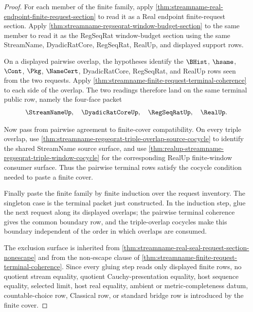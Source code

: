 \begin{proof}
For each member of the finite family, apply
\autoref{thm:streamname-real-endpoint-finite-request-section} to read it as a
Real endpoint finite-request section. Apply
\autoref{thm:streamname-regseqrat-window-budget-section} to the same member to
read it as the RegSeqRat window-budget section using the same StreamName,
DyadicRatCore, RegSeqRat, RealUp, and displayed support rows.

On a displayed pairwise overlap, the hypotheses identify the $\BHist$,
$\hsame$, $\Cont$, $\Pkg$, $\NameCert$, DyadicRatCore, RegSeqRat, and RealUp
rows seen from the two requests. Apply
\autoref{thm:streamname-finite-request-terminal-coherence} to each side of the
overlap. The two readings therefore land on the same terminal public row,
namely the four-face packet
$$
\StreamNameUp,\quad \DyadicRatCoreUp,\quad \RegSeqRatUp,\quad \RealUp.
$$

Now pass from pairwise agreement to finite-cover compatibility. On every
triple overlap, use
\autoref{thm:streamname-regseqrat-triple-overlap-source-cocycle} to identify
the shared StreamName source surface, and use
\autoref{thm:realup-streamname-regseqrat-triple-window-cocycle} for the
corresponding RealUp finite-window consumer surface. Thus the pairwise
terminal rows satisfy the cocycle condition needed to paste a finite cover.

Finally paste the finite family by finite induction over the request
inventory. The singleton case is the terminal packet just constructed. In the
induction step, glue the next request along its displayed overlaps; the
pairwise terminal coherence gives the common boundary row, and the
triple-overlap cocycles make this boundary independent of the order in which
overlaps are consumed.

The exclusion surface is inherited from
\autoref{thm:streamname-real-seal-request-section-nonescape} and from the
non-escape clause of
\autoref{thm:streamname-finite-request-terminal-coherence}. Since every
gluing step reads only displayed finite rows, no quotient stream equality,
quotient Cauchy-presentation equality, host sequence equality, selected limit,
host real equality, ambient or metric-completeness datum, countable-choice row,
Classical row, or standard bridge row is introduced by the finite cover.
\end{proof}

